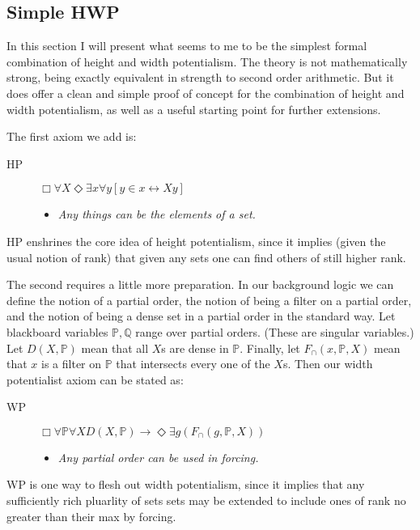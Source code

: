 \documentclass{article}
\begin{document}
\subsection{Simple HWP}
In this section I will present what seems to me to be the simplest formal combination 
of height and width potentialism. The theory is not mathematically strong, being 
exactly equivalent in strength to second order arithmetic. But it does offer a clean 
and simple proof of concept for the combination of height and width potentialism, 
as well as a useful starting point for further extensions.

The first axiom we add is:
\begin{description}
    \item[HP] $\Box \forall X \Diamond \exists x \forall y[y \in x \leftrightarrow Xy]$
    \begin{itemize} 
    \item \emph{Any things can be the elements of a set.}
    \end{itemize}
\end{description}
HP enshrines the core idea of height potentialism, since it implies (given the
usual notion of rank) that given any sets one can find others of still higher rank.

The second requires a little more preparation. In our background logic we 
can define the notion of a partial order, the notion of being a filter on 
a partial order, and the notion of being a dense set in a partial order in 
the standard way. Let blackboard variables $\mathbb{P}, \mathbb{Q}$ range over 
partial orders. (These are singular variables.) Let $D(X, \mathbb{P})$ mean 
that all $X$s are dense in $\mathbb{P}$. Finally, let $F_\cap(x, \mathbb{P}, X)$ 
mean that $x$ is a filter on $\mathbb{P}$ that intersects every one of the $X$s.
Then our width potentialist axiom can be stated as:
\begin{description}
    \item[WP] $\Box \forall \mathbb{P} \forall X D(X, \mathbb{P}) \rightarrow \Diamond \exists g(F_\cap(g, \mathbb{P}, X)) $   \begin{itemize} 
    \item \emph{Any partial order can be used in forcing.}
    \end{itemize}
\end{description}
WP is one way to flesh out width potentialism, since it implies that any 
sufficiently rich pluarlity of sets
sets may be extended to include ones of rank no greater than their max by 
forcing. 
\end{document}
